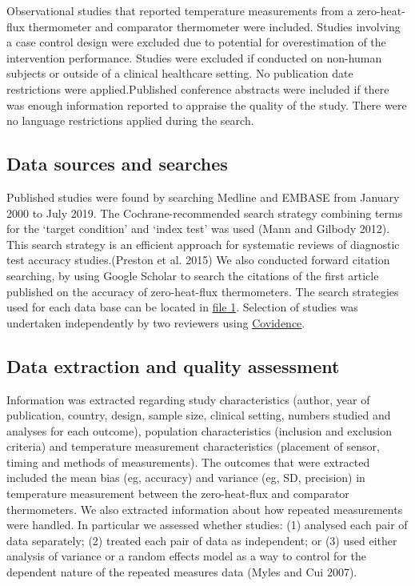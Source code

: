 \documentclass[smallextended]{svjour3}       %
\begin{document}
Observational studies that reported temperature measurements from a
zero-heat-flux thermometer and comparator thermometer were included.
Studies involving a case control design were excluded due to potential
for overestimation of the intervention performance. Studies were
excluded if conducted on non-human subjects or outside of a clinical
healthcare setting. No publication date restrictions were
applied.Published conference abstracts were included if there was enough
information reported to appraise the quality of the study. There were no
language restrictions applied during the search.

\hypertarget{data-sources-and-searches}{%
\subsection{Data sources and searches}\label{data-sources-and-searches}}

Published studies were found by searching Medline and EMBASE from
January 2000 to July 2019. The Cochrane-recommended search strategy
combining terms for the `target condition' and `index test' was used
(Mann and Gilbody 2012). This search strategy is an efficient approach
for systematic reviews of diagnostic test accuracy studies.(Preston et
al. 2015) We also conducted forward citation searching, by using Google
Scholar to search the citations of the first article published on the
accuracy of zero-heat-flux thermometers. The search strategies used for
each data base can be located in \href{}{file 1}. Selection of studies
was undertaken independently by two reviewers using
\href{https://www.covidence.org}{Covidence}.

\hypertarget{data-extraction-and-quality-assessment}{%
\subsection{Data extraction and quality
assessment}\label{data-extraction-and-quality-assessment}}

Information was extracted regarding study characteristics (author, year
of publication, country, design, sample size, clinical setting, numbers
studied and analyses for each outcome), population characteristics
(inclusion and exclusion criteria) and temperature measurement
characteristics (placement of sensor, timing and methods of
measurements). The outcomes that were extracted included the mean bias
(eg, accuracy) and variance (eg, SD, precision) in temperature
measurement between the zero-heat-flux and comparator thermometers. We
also extracted information about how repeated measurements were handled.
In particular we assessed whether studies: (1) analysed each pair of
data separately; (2) treated each pair of data as independent; or (3)
used either analysis of variance or a random effects model as a way to
control for the dependent nature of the repeated measures data (Myles
and Cui 2007).
\end{document}
